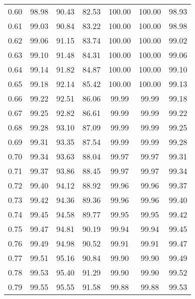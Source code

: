 \begin{tabular}{|c|c|c|c|c|c|c|}
      0.60 &     98.98 &     90.43 &      82.53 &  100.00 &     100.00 &         98.93 \\
      0.61 &     99.03 &     90.84 &      83.22 &  100.00 &     100.00 &         98.98 \\
      0.62 &     99.06 &     91.15 &      83.74 &  100.00 &     100.00 &         99.02 \\
      0.63 &     99.10 &     91.48 &      84.31 &  100.00 &     100.00 &         99.06 \\
      0.64 &     99.14 &     91.82 &      84.87 &  100.00 &     100.00 &         99.10 \\
      0.65 &     99.18 &     92.14 &      85.42 &  100.00 &     100.00 &         99.13 \\
      0.66 &     99.22 &     92.51 &      86.06 &   99.99 &      99.99 &         99.18 \\
      0.67 &     99.25 &     92.82 &      86.61 &   99.99 &      99.99 &         99.22 \\
      0.68 &     99.28 &     93.10 &      87.09 &   99.99 &      99.99 &         99.25 \\
      0.69 &     99.31 &     93.35 &      87.54 &   99.99 &      99.99 &         99.28 \\
      0.70 &     99.34 &     93.63 &      88.04 &   99.97 &      99.97 &         99.31 \\
      0.71 &     99.37 &     93.86 &      88.45 &   99.97 &      99.97 &         99.34 \\
      0.72 &     99.40 &     94.12 &      88.92 &   99.96 &      99.96 &         99.37 \\
      0.73 &     99.42 &     94.36 &      89.36 &   99.96 &      99.96 &         99.40 \\
      0.74 &     99.45 &     94.58 &      89.77 &   99.95 &      99.95 &         99.42 \\
      0.75 &     99.47 &     94.81 &      90.19 &   99.94 &      99.94 &         99.45 \\
      0.76 &     99.49 &     94.98 &      90.52 &   99.91 &      99.91 &         99.47 \\
      0.77 &     99.51 &     95.16 &      90.84 &   99.90 &      99.90 &         99.49 \\
      0.78 &     99.53 &     95.40 &      91.29 &   99.90 &      99.90 &         99.52 \\
      0.79 &     99.55 &     95.55 &      91.58 &   99.88 &      99.88 &         99.53 \\

\end{tabular}
